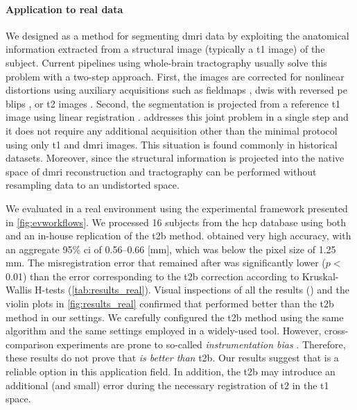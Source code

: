 \paragraph*{Application to real data}
We designed \regseg{} as a method for segmenting \gls*{dmri} data by exploiting the
  anatomical information extracted from a structural image (typically a \gls*{t1} image)
  of the subject.
Current pipelines using whole-brain tractography usually solve this problem with a two-step approach.
First, the images are corrected for nonlinear distortions using auxiliary acquisitions
  such as fieldmaps \citep{jezzard_correction_1995}, \glspl*{dwi} with reversed \gls*{pe}
  blips \citep{chiou_simple_2000}, or \gls*{t2} images \citep{kybic_unwarping_2000}.
Second, the segmentation is projected from a reference \gls*{t1} image using linear
  registration \citep{greve_accurate_2009}.
\Regseg{} addresses this joint problem in a single step and it does not require any additional
  acquisition other than the minimal protocol using only \gls*{t1} and \gls*{dmri} images.
This situation is found commonly in historical datasets.
Moreover, since the structural information is projected into the native space of \gls*{dmri}
  reconstruction and tractography can be performed without resampling data to an undistorted
  space.

We evaluated \regseg{} in a real environment using the experimental framework presented
  in \autoref{fig:evworkflows}.
We processed 16 subjects from the \gls*{hcp} database using both \regseg{}
  and an in-house replication of the \acrfull*{t2b} method.
\Regseg{} obtained very high accuracy, with an aggregate 95\% \gls*{ci} of 0.56--0.66 [mm], which was
  below the pixel size of 1.25 mm.
The misregistration error that remained after \regseg{} was significantly lower ($p <$ 0.01) than the
  error corresponding to the \gls*{t2b} correction according to Kruskal-Wallis H-tests
  (\autoref{tab:results_real}).
Visual inspections of all the results () and the violin plots in
  \autoref{fig:results_real} confirmed that \regseg{} performed better than the \gls*{t2b} method
  in our settings.
We carefully configured the \gls*{t2b} method using the same algorithm and the
  same settings employed in a widely-used tool.
However, cross-comparison experiments are prone to so-called \emph{instrumentation bias}
  \citep{tustison_instrumentation_2013}.
Therefore, these results do not prove that \regseg{} \emph{is better than} \gls*{t2b}.
Our results suggest that \regseg{} is a reliable option in this application field.
In addition, the \gls*{t2b} may introduce an additional (and small) error during the necessary
  registration of \gls*{t2} in the \gls*{t1} space.

